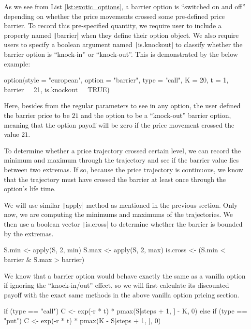 As we see from List \ref{lst:exotic_options}, a barrier option is ``switched on and off'' depending on whether the price movements crossed some pre-defined price barrier. To record this pre-specified quantity, we require user to include a property named \texttt|barrier| when they define their option object. We also require users to specify a boolean argument named \texttt|is.knockout| to classify whether the barrier option is ``knock-in'' or ``knock-out''. This is demonstrated by the below example:

\begin{Rminted}
option(style = "european", option = "barrier", type = "call", K = 20, t = 1, barrier = 21, is.knockout = TRUE)
\end{Rminted}

Here, besides from the regular parameters to see in any option, the user defined the barrier price to be $21$ and the option to be a ``knock-out'' barrier option, meaning that the option payoff will be zero if the price movement crossed the value $21$.

To determine whether a price trajectory crossed certain level, we can record the minimum and maximum through the trajectory and see if the barrier value lies between two extremas. If so, because the price trajectory is continuous, we know that the trajectory must have crossed the barrier at least once through the option's life time.

We will use similar \texttt|apply| method as mentioned in the previous section. Only now, we are computing the minimums and maximums of the trajectories. We then use a boolean vector \texttt|is.cross| to determine whether the barrier is bounded by the extremas.

\begin{Rminted}
S.min <- apply(S, 2, min)
S.max <- apply(S, 2, max)
is.cross <- (S.min < barrier & S.max > barrier)
\end{Rminted}

We know that a barrier option would behave exactly the same as a vanilla option if ignoring the ``knock-in/out'' effect, so we will first calculate its discounted payoff with the exact same methods in the above vanilla option pricing section.

\begin{Rminted}
if (type == "call") {
    C <- exp(-r * t) * pmax(S[steps + 1, ] - K, 0)
} else if (type == "put") {
    C <- exp(-r * t) * pmax(K - S[steps + 1, ], 0)
}
\end{Rminted}

